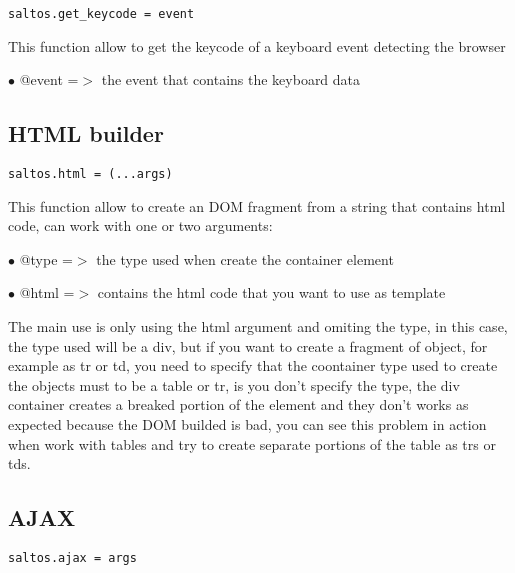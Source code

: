 \documentclass[a4paper]{book}
\begin{document}
\begin{lstlisting}
saltos.get_keycode = event
\end{lstlisting}

This function allow to get the keycode of a keyboard event detecting the browser

\begin{compactitem}
\item[\color{myblue}$\bullet$] @event =$>$ the event that contains the keyboard data
\end{compactitem}

\hypertarget{toc425}{}
\subsection{HTML builder}

\begin{lstlisting}
saltos.html = (...args)
\end{lstlisting}

This function allow to create an DOM fragment from a string that contains html code, can
work with one or two arguments:

\begin{compactitem}
\item[\color{myblue}$\bullet$] @type =$>$ the type used when create the container element
\item[\color{myblue}$\bullet$] @html =$>$ contains the html code that you want to use as template
\end{compactitem}

The main use is only using the html argument and omiting the type, in this case, the
type used will be a div, but if you want to create a fragment of object, for example
as tr or td, you need to specify that the coontainer type used to create the objects
must to be a table or tr, is you don't specify the type, the div container creates
a breaked portion of the element and they don't works as expected because the DOM
builded is bad, you can see this problem in action when work with tables and try to
create separate portions of the table as trs or tds.

\hypertarget{toc426}{}
\subsection{AJAX}

\begin{lstlisting}
saltos.ajax = args
\end{lstlisting}
\end{document}
